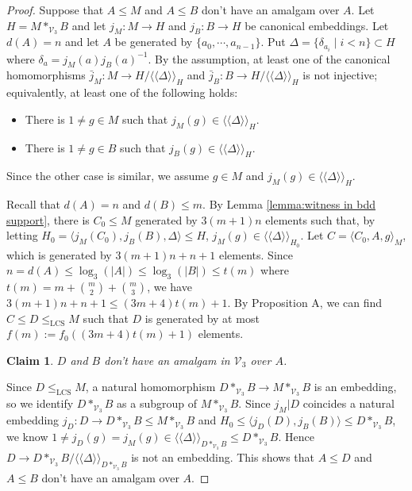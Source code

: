 \documentclass[11pt,reqno]{article}
\newtheorem{claim}{Claim}[theorem]
\theoremstyle{definition}
\theoremstyle{remark}
\newcommand{\LCS}{\mathrm{LCS}}
\newcommand{\llangle}{\langle\!\langle}
\newcommand{\rrangle}{\rangle\!\rangle}
\begin{document}
\begin{proof}
Suppose that $A\leq M$ and $A\leq B$ don't have an amalgam over $A$. 
Let $H=M*_{\mathcal V_3}B$ and let $j_M:M\to H$ and $j_B:B\to H$ be canonical embeddings.
Let $d(A)=n$ and let $A$ be generated by $\{a_0,\cdots, a_{n-1}\}$. 
Put $\Delta=\{\delta_{a_i}\mid i< n\}\subset H$ where $\delta_a=j_M(a)j_B(a)^{-1}$.
By the assumption, at least one of the canonical homomorphisms $\bar j_M:M\to H/\llangle \Delta\rrangle_H$ and $\bar j_B:B\to H/\llangle \Delta \rrangle_H$ is not injective; equivalently, at least one of the following holds:
\begin{itemize}
    \item There is $1\neq g\in M$ such that $j_M(g)\in \llangle \Delta \rrangle_H$.
    \item There is $1\neq g\in B$ such that $j_B(g)\in \llangle \Delta \rrangle_H$.
\end{itemize}
Since the other case is similar, we assume $g\in M$ and $j_M(g)\in \llangle \Delta \rrangle_H$.

Recall that $d(A)=n$ and $d(B)\leq m$.
By Lemma \ref{lemma:witness in bdd support},
there is $C_0\leq M$ generated by $3(m+1)n$ elements such that, by letting $H_0=\langle j_M(C_0),j_B(B),\Delta\rangle \leq H$, $j_M(g)\in \llangle \Delta\rrangle_{H_0}$.
Let $C=\langle C_0,A,g\rangle_M$, which is generated by $3(m+1)n+n+1$ elements.
Since $n= d(A)\leq \log_3(|A|) \leq \log_3(|B|) \leq t(m)$ where $t(m)=m+\binom m2+\binom m3$,
we have $3(m+1)n+n+1\leq (3m+4)t(m)+1$.
By Proposition A, we can find $C\leq D\leq_\LCS M$ such that $D$ is generated by at most $f(m):=f_0((3m+4)t(m)+1)$ elements.

\begin{claim}
$D$ and $B$ don't have an amalgam in $\mathcal V_3$ over $A$.
\end{claim}
Since $D\leq_\LCS M$, a natural homomorphism $D*_{\mathcal V_3}B \to M*_{\mathcal V_3}B$ is an embedding, so we identify $D*_{\mathcal V_3}B$ as a subgroup of $M*_{\mathcal V_3}B$.
Since $j_M|D$ coincides a natural embedding $j_D:D\to D*_{\mathcal V_3}B\leq M*_{\mathcal V_3}B$ and $H_0\leq \langle j_D(D),j_B(B)\rangle\leq D*_{\mathcal V_3}B$, we know $1\neq j_D(g)=j_M(g)\in \llangle \Delta\rrangle_{D*_{\mathcal V_3}B}\leq D*_{\mathcal V_3}B$.
Hence $D\to D*_{\mathcal V_3}B/\llangle \Delta\rrangle_{D*_{\mathcal V_3}B}$ is not an embedding. This shows that $A\leq D$ and $A\leq B$ don't have an amalgam over $A$.
\end{proof}
\end{document}
